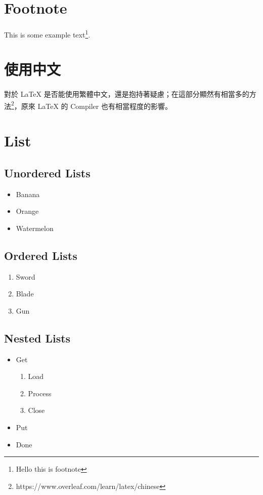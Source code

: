 \documentclass{article}
\begin{document}
\section{Footnote}
\paragraph{}
This is some example text\footnote{\label{myfootnote}Hello this is footnote}.
\section{使用中文}
\paragraph{}
對於 LaTeX 是否能使用繁體中文，還是抱持著疑慮；在這部分顯然有相當多的方法\footnote{\label{cjk}https://www.overleaf.com/learn/latex/chinese}，原來 LaTeX 的 Compiler 也有相當程度的影響。
\section{List}
\subsection{Unordered Lists}
    \begin{itemize}
        \item Banana
        \item Orange
        \item Watermelon
    \end{itemize}
\subsection{Ordered Lists}
    \begin{enumerate}
        \item Sword
        \item Blade
        \item Gun
    \end{enumerate}
\subsection{Nested Lists}
    \begin{itemize}
        \item Get
            \begin{enumerate}
                \item Load
                \item Process
                \item Close
            \end{enumerate}
        \item Put
        \item Done
    \end{itemize}
\newpage
\end{document}
